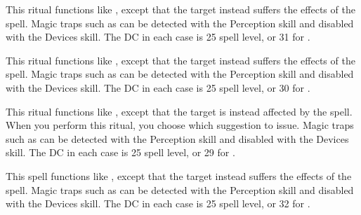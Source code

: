 \spellspecial This ritual functions like , except that the target instead suffers the effects of the  spell.
\spellnotes Magic traps such as  can be detected with the Perception skill and disabled with the Devices skill. The DC in each case is 25 \add spell level, or 31 for .

\spellspecial This ritual functions like , except that the target instead suffers the effects of the  spell.
\spellnotes Magic traps such as  can be detected with the Perception skill and disabled with the Devices skill. The DC in each case is 25 \add spell level, or 30 for .

\spellspecial This ritual functions like , except that the target is instead affected by the  spell. When you perform this ritual, you choose which suggestion to issue.
\spellnotes Magic traps such as  can be detected with the Perception skill and disabled with the Devices skill. The DC in each case is 25 \add spell level, or 29 for .

\spelleffect This spell functions like , except that the target instead suffers the effects of the  spell.
\spellnotes Magic traps such as  can be detected with the Perception skill and disabled with the Devices skill. The DC in each case is 25 \add spell level, or 32 for .

